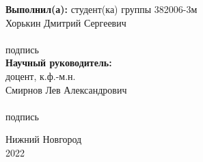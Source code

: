 \begin{titlepage}
\begin{minipage}[t]{.36\linewidth}
\begin{flushleft}
			\textbf{Выполнил(а):} студент(ка) группы 382006-3м \\
			Хорькин Дмитрий Сергеевич\\
			\vspace{1.0em}
			\hrulefill  \\
			{\small подпись}\\
			
			\vspace{1.5em}
			\textbf{Научный руководитель:}\\
		доцент, к.ф.-м.н.\\
			Смирнов Лев Александрович\\
			\vspace{1.0em}
			\hrulefill  \\
			{\small подпись}
			
    	\end{flushleft}
    \end{minipage}

	\vspace{\fill}

	\begin{center}
		Нижний Новгород \\
		2022
	\end{center}

\end{titlepage}